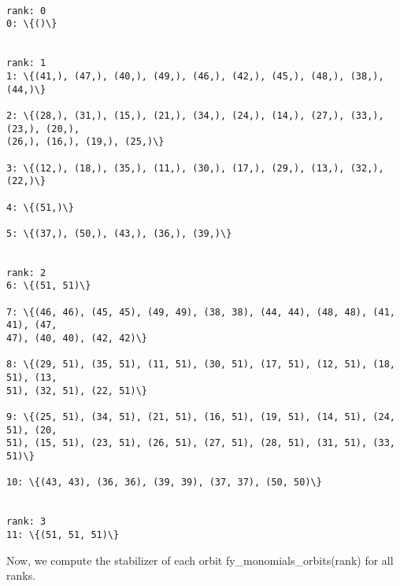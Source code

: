 \documentclass[11pt]{article}
\begin{document}
    \begin{Verbatim}[commandchars=\\\{\}]

rank: 0
0: \{()\}


rank: 1
1: \{(41,), (47,), (40,), (49,), (46,), (42,), (45,), (48,), (38,), (44,)\}

2: \{(28,), (31,), (15,), (21,), (34,), (24,), (14,), (27,), (33,), (23,), (20,),
(26,), (16,), (19,), (25,)\}

3: \{(12,), (18,), (35,), (11,), (30,), (17,), (29,), (13,), (32,), (22,)\}

4: \{(51,)\}

5: \{(37,), (50,), (43,), (36,), (39,)\}


rank: 2
6: \{(51, 51)\}

7: \{(46, 46), (45, 45), (49, 49), (38, 38), (44, 44), (48, 48), (41, 41), (47,
47), (40, 40), (42, 42)\}

8: \{(29, 51), (35, 51), (11, 51), (30, 51), (17, 51), (12, 51), (18, 51), (13,
51), (32, 51), (22, 51)\}

9: \{(25, 51), (34, 51), (21, 51), (16, 51), (19, 51), (14, 51), (24, 51), (20,
51), (15, 51), (23, 51), (26, 51), (27, 51), (28, 51), (31, 51), (33, 51)\}

10: \{(43, 43), (36, 36), (39, 39), (37, 37), (50, 50)\}


rank: 3
11: \{(51, 51, 51)\}

    \end{Verbatim}

    Now, we compute the stabilizer of each orbit fy\_monomials\_orbits(rank)
for all ranks.
\end{document}
